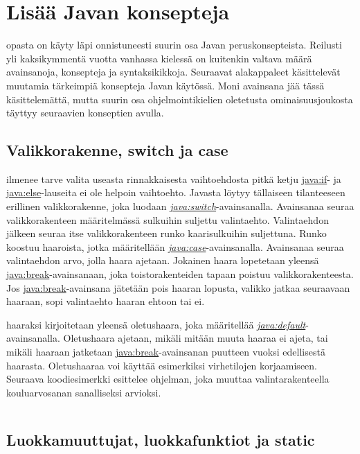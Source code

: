 \documentclass{tufte-book}
\newcommand{\java}[1]{\underline{\gls{java:#1}}}
\newcommand{\newjava}[1]{\textit{\java{#1}}}
\newcommand{\code}[3]{
\begin{listing}
    \inputminted{java}{OhjelmointiopasEsimerkit/src/#1/#2.java}
    \caption{#3}
    \label{Java-#1-#2}
\end{listing}
}
\begin{document}
\section{Lisää Javan konsepteja}
\label{loput perusteet}

 opasta on käyty läpi onnistuneesti suurin osa Javan
peruskonsepteista. Reilusti yli kaksikymmentä vuotta vanhassa kielessä on kuitenkin valtava määrä
avainsanoja, konsepteja ja syntaksikikkoja. Seuraavat alakappaleet käsittelevät muutamia
tärkeimpiä konsepteja Javan käytössä. Moni avainsana jää tässä käsittelemättä, mutta suurin osa
ohjelmointikielien oletetusta ominaisuusjoukosta täyttyy seuraavien konseptien avulla.

\subsection{Valikkorakenne, switch ja case}
\label{switch}

 ilmenee tarve valita useasta rinnakkaisesta vaihtoehdosta pitkä
ketju \java{if}- ja \java{else}-lauseita ei ole helpoin vaihtoehto. Javasta löytyy tällaiseen
tilanteeseen erillinen valikkorakenne, joka luodaan \newjava{switch}-avainsanalla. Avainsanaa
seuraa valikkorakenteen määritelmässä sulkuihin suljettu valintaehto. Valintaehdon jälkeen
seuraa itse valikkorakenteen runko kaarisulkuihin suljettuna. Runko koostuu haaroista, jotka
määritellään \newjava{case}-avainsanalla. Avainsanaa seuraa valintaehdon arvo, jolla haara
ajetaan. Jokainen haara lopetetaan yleensä \java{break}-avainsanaan, joka toistorakenteiden
tapaan poistuu valikkorakenteesta. Jos \java{break}-avainsana jätetään pois haaran lopusta,
valikko jatkaa seuraavaan haaraan, sopi valintaehto haaran ehtoon tai ei.

 haaraksi kirjoitetaan yleensä oletushaara, joka
määritellää \newjava{default}-avainsanalla. Oletushaara ajetaan, mikäli mitään muuta haaraa ei
ajeta, tai mikäli haaraan jatketaan \java{break}-avainsanan puutteen vuoksi edellisestä haarasta.
Oletushaaraa voi käyttää esimerkiksi virhetilojen korjaamiseen. Seuraava koodiesimerkki esittelee
ohjelman, joka muuttaa valintarakenteella kouluarvosanan sanalliseksi arvioksi.

\code{week3/basicexamples}{Switch}{Valikkorakenne, \java{switch}- ja \java{case} -avainsanojen
käyttö Javassa}

\subsection{Luokkamuuttujat, luokkafunktiot ja static}
\label{static}
\end{document}
